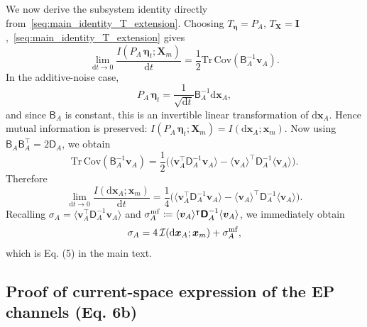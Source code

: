 \documentclass[
 longbibliography,
 twocolumn,
 superscriptaddress,
 amsmath,
 amssymb,
 amsthm,
 amsfonts,
 prl,
 floatfix,
]{revtex4-2}
\newcommand{\matbf}[1]{\boldsymbol{\mathsf{#1}}}
\begin{document}
\begin{widetext}
We now derive the subsystem identity directly from~\eqref{seq:main_identity_T_extension}. Choosing $T_{\bm\eta}=P_A$, $T_{\bm X}=\mathbf I$,~\eqref{seq:main_identity_T_extension} gives
\[
    \lim_{\mathrm dt\rightarrow0}\frac{I(P_A\,\bm\eta_t;\bm X_m)}{\mathrm dt}
    =\frac{1}{2}\mathrm{Tr}\,\mathrm{Cov}(\matbf B_A^{-1}\bm v_A).
\]
In the additive-noise case,
\[
    P_A\,\bm\eta_t=\frac{1}{\sqrt{\mathrm dt}}\matbf B_A^{-1}\mathrm d\bm x_A,
\]
and since $\matbf B_A$ is constant, this is an invertible linear transformation of $\mathrm d\bm x_A$. Hence mutual information is preserved: $I(P_A\,\bm\eta_t;\bm X_m)=I(\mathrm d\bm x_A;\bm x_m)$.
Now using $\matbf B_A\matbf B_A^\intercal=2\matbf D_A$, we obtain
\[
    \mathrm{Tr}\,\mathrm{Cov}(\matbf B_A^{-1}\bm v_A)
    =\frac{1}{2}\Big(\langle\bm v_A^\intercal\matbf D_A^{-1}\bm v_A\rangle-\langle\bm v_A\rangle^\intercal\matbf D_A^{-1}\langle\bm v_A\rangle\Big).
\]
Therefore
\[
    \lim_{\mathrm dt\rightarrow0}\frac{I(\mathrm d\bm x_A;\bm x_m)}{\mathrm dt}
    =\frac{1}{4}\Big(\langle\bm v_A^\intercal\matbf D_A^{-1}\bm v_A\rangle-\langle\bm v_A\rangle^\intercal\matbf D_A^{-1}\langle\bm v_A\rangle\Big).
\]
Recalling $\sigma_A=\langle\bm v_A^\intercal\matbf D_A^{-1}\bm v_A\rangle$ and $\sigma_A^{\rm mf}\coloneq\langle\bm v_A\rangle^\intercal\matbf D_A^{-1}\langle\bm v_A\rangle$, we immediately obtain
\begin{equation}
    \sigma_A=4\,\mathcal I(\mathrm d\bm x_A;\bm x_m)+\sigma_A^{\rm mf},
    \label{seq:local_EP_equality}
\end{equation}
which is Eq. (5) in the main text.

\subsection{Proof of current-space expression of the EP channels (Eq. 6b)}
\vspace*{-0.6\baselineskip}


\end{widetext}
\end{document}
